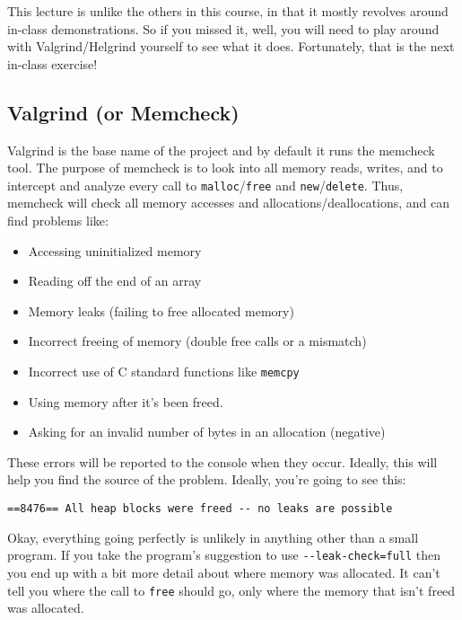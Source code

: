 This lecture is unlike the others in this course, in that it mostly revolves around in-class demonstrations. So if you missed it, well, you will need to play around with Valgrind/Helgrind yourself to see what it does. Fortunately, that is the next in-class exercise!

\subsection*{Valgrind (or Memcheck) }
Valgrind is the base name of the project and by default it runs the memcheck tool. The purpose of memcheck is to look into all memory reads, writes, and to intercept and analyze every call to \texttt{malloc}/\texttt{free} and \texttt{new}/\texttt{delete}. Thus, memcheck will check all memory accesses and allocations/deallocations, and can find problems like:
\begin{itemize}
	\item Accessing uninitialized memory
	\item Reading off the end of an array
	\item Memory leaks (failing to free allocated memory)
	\item Incorrect freeing of memory (double free calls or a mismatch)
	\item Incorrect use of C standard functions like \texttt{memcpy}
	\item Using memory after it's been freed.
	\item Asking for an invalid number of bytes in an allocation (negative\textinterrobang)
\end{itemize}

These errors will be reported to the console when they occur. Ideally, this will help you find the source of the problem. Ideally, you're going to see this:
\begin{verbatim}
==8476== All heap blocks were freed -- no leaks are possible
\end{verbatim}

Okay, everything going perfectly is unlikely in anything other than a small program.  If you take the program's suggestion to use \verb+--leak-check=full+ then you end up with a bit more detail about where memory was allocated. It can't tell you where the call to \texttt{free} should go, only where the memory that isn't freed was allocated.

